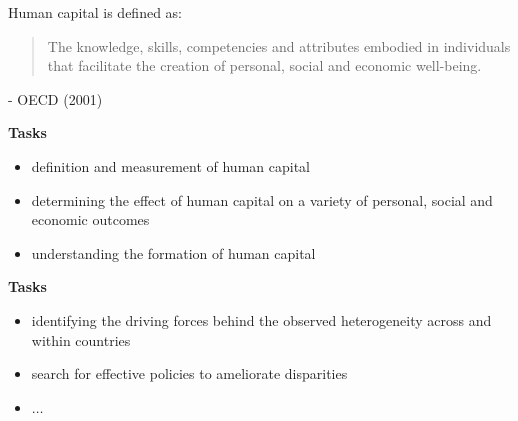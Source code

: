 
\begin{frame}
Human capital is defined as:
\vspace{\baselineskip}

\begin{quote}
The knowledge, skills, competencies and attributes embodied in individuals that facilitate
the creation of personal, social and economic well-being.
\end{quote}\vspace{-0.5pt} \hspace{6cm} - OECD (2001)
\end{frame}
\begin{frame}
\textbf{Tasks}\vspace{0.3cm}

\begin{itemize}\setlength\itemsep{1em}
\item definition and measurement of human capital
\item determining the effect of human capital on a variety of personal, social and economic outcomes
\item understanding the formation of human capital
\end{itemize}
\end{frame}
\begin{frame}
\textbf{Tasks}\vspace{0.3cm}

\begin{itemize}\setlength\itemsep{1em}
\item identifying the driving forces behind the observed heterogeneity across and within countries
\item search for effective policies to ameliorate disparities
\item $\hdots$
\end{itemize}
\end{frame}
